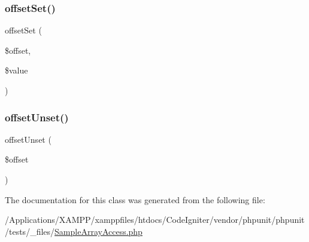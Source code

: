 \mbox{\label{class_sample_array_access_ac6bde6b1eb50eb5377e91771fe46b7a3}} 
\subsubsection{\texorpdfstring{offset\+Set()}{offsetSet()}}
{\footnotesize\ttfamily offset\+Set (\begin{DoxyParamCaption}\item[{}]{\$offset,  }\item[{}]{\$value }\end{DoxyParamCaption})}

\mbox{\label{class_sample_array_access_a2411227ea7118b13495de9839fd4b563}} 
\subsubsection{\texorpdfstring{offset\+Unset()}{offsetUnset()}}
{\footnotesize\ttfamily offset\+Unset (\begin{DoxyParamCaption}\item[{}]{\$offset }\end{DoxyParamCaption})}



The documentation for this class was generated from the following file\+:\begin{DoxyCompactItemize}
\item 
/\+Applications/\+X\+A\+M\+P\+P/xamppfiles/htdocs/\+Code\+Igniter/vendor/phpunit/phpunit/tests/\+\_\+files/\mbox{\hyperlink{_sample_array_access_8php}{Sample\+Array\+Access.\+php}}\end{DoxyCompactItemize}
